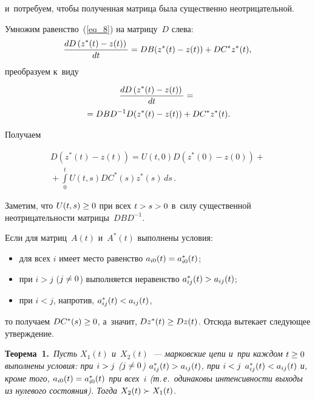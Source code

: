 \begin{multicols}{2}
\vspace*{-2pt}

\noindent 
и~потребуем, чтобы полученная матрица была существенно 
неотрицательной.


Умножим равенство~(\ref{eq_8}) на матрицу~$D$ слева:
\begin{equation*}
\displaystyle\frac{\displaystyle dD\left(z^*(t)-z(t)\right)\mathstrut}{\displaystyle dt\mathstrut} = DB(z^*(t)-z(t)) + DC^*z^*(t),
\end{equation*}
преобразуем к~виду

\vspace*{-3pt}

\noindent
\begin{multline*}
\displaystyle\frac{\displaystyle dD\left(z^*(t)-z(t)\right)\mathstrut}{\displaystyle dt\mathstrut} = {}\\
{}=DBD^{-1} D (z^*(t)-z(t))+ DC^*z^*(t).
\end{multline*}

\vspace*{-2pt}

Получаем

\vspace*{-3pt}

\noindent
\begin{multline*}
D\left(z^*(t)-z(t)\right)=U(t,0)D\left(z^*(0)-z(0)\right)+{}\\
{}+
\int\limits_0^t U(t,s) DC^*(s)z^*(s)\,ds\,.
\end{multline*}

\vspace*{-3pt}

Заметим, что $U(t,s)\hm\geq 0$ при всех $t\hm>s\hm>0$ в~силу существенной 
неотрицательности матрицы~$DBD^{-1}$.


Если для матриц~$A(t)$ и~$A^*(t)$ выполнены условия:
\begin{itemize}
  \item для всех $i$ имеет место равенство $a_{i0}(t)\hm=a^*_{i0}(t)$;
    \item при $i>j$ ($j\hm\neq 0$)  выполняется неравенство $a^*_{ij}(t)\hm> 
a_{ij}(t)$;
    \item при $i<j$, напротив, $a^*_{ij}(t)\hm<a_{ij}(t)$,
\end{itemize}
то получаем  $DC^*(s)\hm\ge 0 $, а~значит, $Dz^*(t)\hm\ge Dz(t)$.
Отсюда вытекает следующее утверждение.

\smallskip

\noindent
\textbf{Теорема~1.}\ \textit{Пусть  $X_1(t)$ и~$X_2(t)$~--- марковские цепи и~при каждом $t 
\hm\ge 0$ выполнены условия: при $i\hm>j$ ($j\hm\neq 0$) $a^*_{ij}(t)\hm> a_{ij}(t)$, при 
$i\hm<j$ $a^*_{ij}(t)\hm<a_{ij}(t)$ и, кроме того,  $a_{i0}(t)\hm=a^*_{i0}(t)$ при  всех~$i$  
(т.\,е.\ одинаковы интенсивности выходы из нулевого состояния). Тогда  
$X_2(t) \hm\succ X_1(t)$.
}


\end{multicols}
